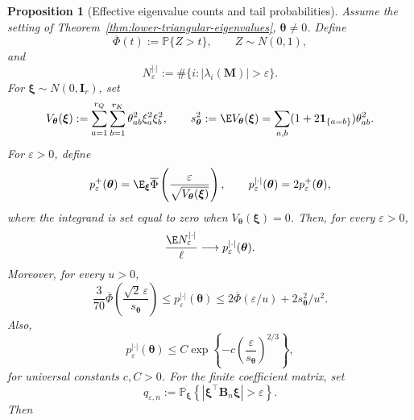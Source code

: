 \documentclass{article}
\newcommand{\Prob}{\mathbb{P}}
\newcommand{\bB}{\mathbf{B}}
\newcommand{\bM}{\mathbf{M}}
\newcommand{\barPhi}{\overline{\Phi}}
\newtheorem{proposition}[theorem]{Proposition}
\theoremstyle{definition}
\theoremstyle{remark}
\begin{document}
\begin{proposition}[Effective eigenvalue counts and tail probabilities]
Assume the setting of Theorem~\ref{thm:lower-triangular-eigenvalues},
$\boldsymbol{\theta}\neq0$.  Define
\[
    \barPhi(t):=\Prob\{Z>t\},
    \qquad Z\sim N(0,1),
\]
and
\[
    N_\varepsilon^{|\cdot|}
    :=
    \#\{i:|\lambda_i(\bM)|>\varepsilon\}.
\]
For $\boldsymbol{\xi}\sim N(0,\mathbf I_r)$, set
\[
    V_{\boldsymbol{\theta}}(\boldsymbol{\xi})
    :=
    \sum_{a=1}^{r_Q}\sum_{b=1}^{r_K}
    \theta_{ab}^2\xi_a^2\xi_b^2,
    \qquad
    s_{\boldsymbol{\theta}}^2
    :=
    \E V_{\boldsymbol{\theta}}(\boldsymbol{\xi})
    =
    \sum_{a,b}(1+2\mathbf 1_{\{a=b\}})\theta_{ab}^2.
\]
For $\varepsilon>0$, define
\begin{equation}
    p_\varepsilon^+(\boldsymbol{\theta})
    =
    \E_{\boldsymbol{\xi}}
    \barPhi\left(
        \frac{\varepsilon}
        {\sqrt{V_{\boldsymbol{\theta}}(\boldsymbol{\xi})}}
    \right),
    \qquad
    p_\varepsilon^{|\cdot|}(\boldsymbol{\theta})
    =
    2p_\varepsilon^+(\boldsymbol{\theta}),
    \label{eq:eigenvalue-tail-definitions}
\end{equation}
where the integrand is set equal to zero when
$V_{\boldsymbol{\theta}}(\boldsymbol{\xi})=0$.  Then, for every
$\varepsilon>0$,
\begin{equation}
    \frac{\E N_\varepsilon^{|\cdot|}}{\ell}
    \longrightarrow
    p_\varepsilon^{|\cdot|}(\boldsymbol{\theta}).
    \label{eq:effective-count-exact-limit}
\end{equation}
Moreover, for every $u>0$,
\begin{equation}
    \frac{3}{70}
    \barPhi\left(
    \frac{\sqrt2\,\varepsilon}{s_{\boldsymbol{\theta}}}
    \right)
    \leq
    p_\varepsilon^{|\cdot|}(\boldsymbol{\theta})
    \leq
    2\barPhi(\varepsilon/u)+2s_{\boldsymbol{\theta}}^2/u^2.
    \label{eq:eigenvalue-tail-two-sided}
\end{equation}
Also,
\begin{equation}
    p_\varepsilon^{|\cdot|}(\boldsymbol{\theta})
    \leq
    C\exp\left\{
        -c\left(\frac{\varepsilon}{s_{\boldsymbol{\theta}}}\right)^{2/3}
    \right\},
    \label{eq:eigenvalue-chaos-tail-bound}
\end{equation}
for universal constants $c,C>0$.  For the finite coefficient matrix, set
\[
    q_{\varepsilon,n}
    :=
    \Prob_{\boldsymbol{\xi}}
    \left\{\left|\boldsymbol{\xi}^\top\bB_n\boldsymbol{\xi}\right|>
    \varepsilon\right\}.
\]
Then
\begin{equation}

\end{equation}
\end{proposition}
\end{document}
